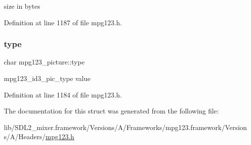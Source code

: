 size in bytes 

Definition at line 1187 of file mpg123.\+h.

\mbox{\label{structmpg123__picture_a4b5897550d36cad90aa463e318a7ca54}} 
\subsubsection{\texorpdfstring{type}{type}}
{\footnotesize\ttfamily char mpg123\+\_\+picture\+::type}

mpg123\+\_\+id3\+\_\+pic\+\_\+type value 

Definition at line 1184 of file mpg123.\+h.



The documentation for this struct was generated from the following file\+:\begin{DoxyCompactItemize}
\item 
lib/\+S\+D\+L2\+\_\+mixer.\+framework/\+Versions/\+A/\+Frameworks/mpg123.\+framework/\+Versions/\+A/\+Headers/\mbox{\hyperlink{mpg123_8h}{mpg123.\+h}}\end{DoxyCompactItemize}
